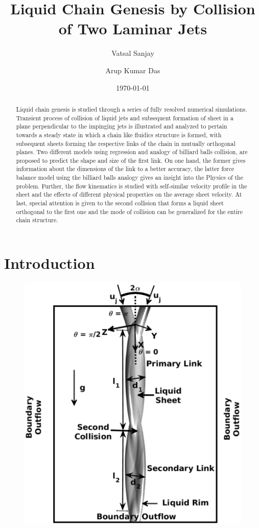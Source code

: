 \documentclass[%
aip,
sd,%
amsmath,amssymb,
preprint,%
author-year,%
]{revtex4-1}
\begin{document}
\newcommand{\MarkerCircleRed}{\raisebox{0.5pt}{\tikz{\node[draw,scale=0.4,circle,fill=red!100!red](){};}}}
\newcommand{\MarkerSquareRed}{\raisebox{0.5pt}{\tikz{\node[draw,scale=0.4,regular polygon, regular polygon sides=4,fill=black!20!red](){};}}}
\newcommand{\MarkerDiamondBlack}{\raisebox{0pt}{\tikz{\node[draw,scale=0.4,diamond,fill=black!100!](){};}}}


\title{Liquid Chain Genesis by Collision of Two Laminar Jets}
\author{Vatsal Sanjay}
\author{Arup Kumar Das}
\date{\today}

\begin{abstract}
Liquid chain genesis is studied through a series of fully resolved numerical simulations. Transient process of collision of liquid jets and subsequent formation of sheet in a plane perpendicular to the impinging jets is illustrated and analyzed to pertain towards a steady state in which a chain like fluidics structure is formed, with subsequent sheets forming the respective links of the chain in mutually orthogonal planes. Two different models using regression and analogy of billiard balls collision, are proposed to predict the shape and size of the first link. On one hand, the former gives information about the dimensions of the link to a better accuracy, the latter force balance model using the billiard balls analogy gives an insight into the Physics of the problem. Further, the flow kinematics is studied with self-similar velocity profile in the sheet and the effects of different physical properties on the average sheet velocity. At last, special attention is given to the second collision that forms a liquid sheet orthogonal to the first one and the mode of collision can be generalized for the entire chain structure.     
\end{abstract}
\maketitle

\section{Introduction}\label{Sec::Introduction}
\begin{figure}[H]
	\centering
	\includegraphics[width=0.5\linewidth]{schematic}
	\caption{}
	\label{Figure::schematic}
\end{figure}
\lipsum
\end{document}
